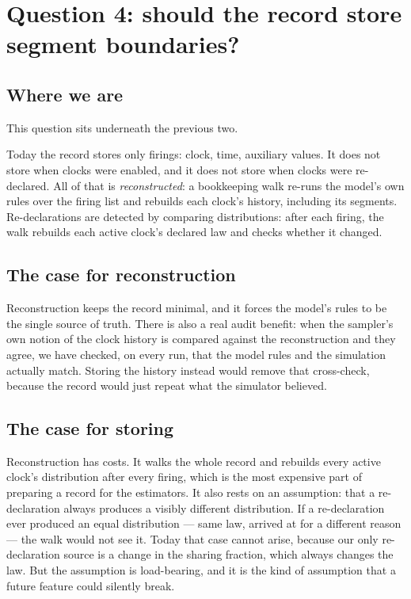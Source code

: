 \documentclass[11pt]{article}
\begin{document}
\section{Question 4: should the record store segment boundaries?}

\subsection{Where we are}

This question sits underneath the previous two.

Today the record stores only firings: clock, time, auxiliary values. It
does not store when clocks were enabled, and it does not store when clocks
were re-declared. All of that is \emph{reconstructed}: a bookkeeping walk
re-runs the model's own rules over the firing list and rebuilds each
clock's history, including its segments. Re-declarations are detected by
comparing distributions: after each firing, the walk rebuilds each active
clock's declared law and checks whether it changed.

\subsection{The case for reconstruction}

Reconstruction keeps the record minimal, and it forces the model's rules
to be the single source of truth. There is also a real audit benefit: when
the sampler's own notion of the clock history is compared against the
reconstruction and they agree, we have checked, on every run, that the
model rules and the simulation actually match. Storing the history instead
would remove that cross-check, because the record would just repeat what
the simulator believed.

\subsection{The case for storing}

Reconstruction has costs. It walks the whole record and rebuilds every
active clock's distribution after every firing, which is the most
expensive part of preparing a record for the estimators. It also rests on
an assumption: that a re-declaration always produces a visibly different
distribution. If a re-declaration ever produced an equal distribution ---
same law, arrived at for a different reason --- the walk would not see it.
Today that case cannot arise, because our only re-declaration source is a
change in the sharing fraction, which always changes the law. But the
assumption is load-bearing, and it is the kind of assumption that a future
feature could silently break.
\end{document}
